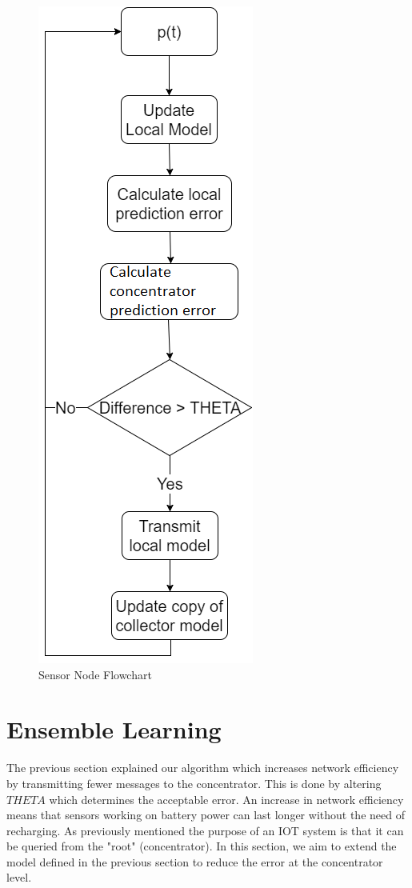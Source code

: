 \documentclass{mproj}
\begin{document}
\begin{figure}[H]
\caption{Sensor Node Flowchart}
\label{fig:nea}
\centerline{\includegraphics[scale=0.7]{NetworkEfficiencyAlgorithm}}
\end{figure}

\section{Ensemble Learning}
\label{sec:ensembleLearning}
The previous section explained our algorithm which increases network efficiency by transmitting fewer messages to the concentrator. This is done by altering $THETA$ which determines the acceptable error. An increase in network efficiency means that sensors working on battery power can last longer without the need of recharging. As previously mentioned the purpose of an IOT system is that it can be queried from the "root" (concentrator). In this section, we aim to extend the model defined in the previous section to reduce the error at the concentrator level.
\end{document}
